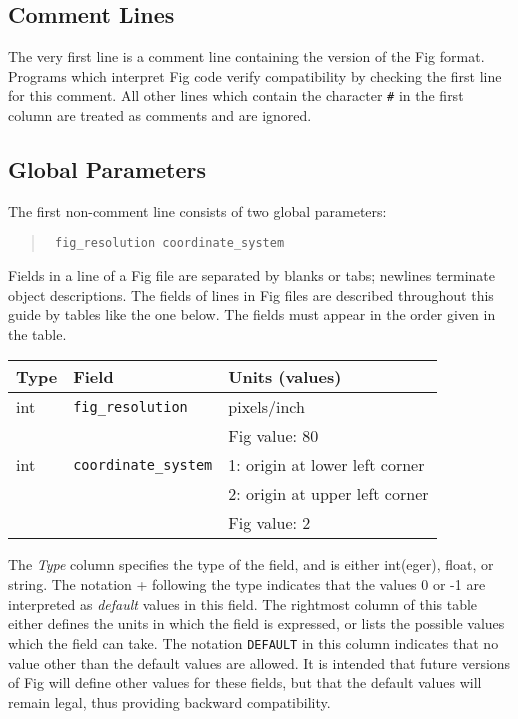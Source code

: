 \subsection{Comment Lines}
The very first line is a comment line containing the version
	of the Fig format.
Programs which interpret Fig code verify compatibility by checking
	the first line for this comment.
All other lines which contain the character \verb|#| in the first column
	are treated as comments and are ignored.

\subsection{Global Parameters}
The first non-comment line consists of two global parameters:
%
\begin{quote}
\tt
fig\_resolution coordinate\_system
\end{quote}
%
Fields in a line of a Fig file are separated by blanks or tabs;
	newlines terminate object descriptions.
The fields of lines in Fig files are described throughout this
	guide by tables like the one below.
The fields must appear in the order given in the table.
%
\vspace{2pt}
\begin{center}
\begin{tabular}{|l|l|l|}
\hline
Type	& Field				& Units (values)		\\
\hline
\hline
int	& {\tt fig\_resolution}		& pixels/inch			\\
	&				& Fig value: 80			\\
\hline
int	& {\tt coordinate\_system}	& 1: origin at lower left corner\\
	&				& 2: origin at upper left corner\\
	&				& Fig value: 2			\\
\hline
\end{tabular}
\end{center}
\vspace{2pt}

The {\em Type} column specifies the type of the field,
	and is either int(eger), float, or string.
The notation + following the type indicates that the values 0 or -1
	 are interpreted as {\em default} values in this field.
The rightmost column of this table either defines the units in which
	the field is expressed, or lists the possible values which
	the field can take.
The notation {\tt DEFAULT} in this column indicates that no value other
	than the default values are allowed.
It is intended that future versions of Fig will define other values for
	these fields, but that the default values will remain legal,
	thus providing backward compatibility.

